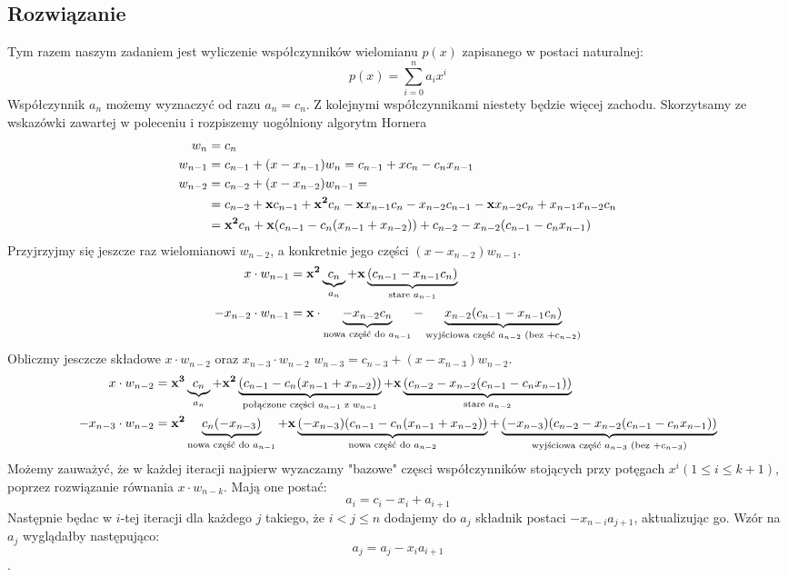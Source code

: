 \documentclass[a4paper]{article}
\begin{document}
    \subsection{Rozwiązanie}
    Tym razem naszym zadaniem jest wyliczenie współczynników wielomianu $p(x)$ zapisanego w postaci naturalnej:
    \[ p(x) = \sum_{i=0}^{n} a_ix^i\]
    Współczynnik $a_n$ możemy wyznaczyć od razu $a_n = c_n$. Z kolejnymi współczynnikami niestety będzie więcej zachodu.
    Skorzytsamy ze wskazówki zawartej w poleceniu i rozpiszemy uogólniony algorytm Hornera
    \begin{align*}
        w_n     &= c_n \\
        w_{n-1} &= c_{n-1} + (x-x_{n-1})w_n = c_{n-1} + xc_{n} - c_nx_{n-1} \\
        w_{n-2} &= c_{n-2} + (x-x_{n-2})w_{n-1} =\\
        &= c_{n-2} + \bold{x}c_{n-1} + \bold{x^2}c_{n} - \bold{x}x_{n-1}c_n - x_{n-2}c_{n-1} - \bold{x}x_{n-2}c_{n} + x_{n-1}x_{n-2}c_n \\
        &= \bold{x^2}c_{n} + \bold{x}(c_{n-1} - c_n(x_{n-1} + x_{n-2})) + c_{n-2} - x_{n-2}(c_{n-1} - c_nx_{n-1})
    \end{align*}
    Przyjrzyjmy się jeszcze raz wielomianowi $w_{n-2}$, a konkretnie jego części $(x-x_{n-2})w_{n-1}$.
    \begin{align*}
        x \cdot w_{n-1} &= \bold{x^2}\underbrace{c_n}_{a_n} + \bold{x}\underbrace{(c_{n-1} - x_{n-1}c_n)}_{\text{stare $a_{n-1}$}} \\
        -x_{n-2} \cdot w_{n-1} &= \bold{x}\cdot\underbrace{-x_{n-2}c_n}_{\text{nowa część do $a_{n-1}$}} - \underbrace{x_{n-2}(c_{n-1} - x_{n-1}c_n)}_{\text{wyjściowa część $a_{n-2}$ (bez $ + c_{n-2}$)}}
    \end{align*}
    Obliczmy jesczcze składowe $x \cdot w_{n-2}$ oraz $x_{n-3} \cdot w_{n-2}$ $w_{n-3} = c_{n-3} + (x - x_{n-3})w_{n-2}$.\\
    \begin{align*}
         x \cdot w_{n-2} &=  \bold{x^3}\underbrace{c_n}_{a_n} + \bold{x^2}\underbrace{(c_{n-1} - c_n(x_{n-1} + x_{n-2}))}_{\text{połączone części } a_{n-1} \text{ z } w_{n-1}} + \bold{x}\underbrace{(c_{n-2} - x_{n-2}(c_{n-1} - c_nx_{n-1}))}_{\text{stare } a_{n-2}} \\
         -x_{n-3} \cdot w_{n-2} &= \bold{x^2}\underbrace{c_n(-x_{n-3})}_{\text{nowa część do } a_{n-1}} + \bold{x}\underbrace{(-x_{n-3})(c_{n-1} - c_n(x_{n-1} + x_{n-2}))}_{\text{nowa część do } a_{n-2}} + \underbrace{(-x_{n-3})(c_{n-2} - x_{n-2}(c_{n-1} - c_nx_{n-1}))}_{\text{wyjściowa część $a_{n-3}$ (bez $ + c_{n-3}$)}} \\
    \end{align*}
    Możemy zauważyć, że w każdej iteracji najpierw wyzaczamy "bazowe" częsci współczynników stojących przy potęgach $x^i (1 \leq i \leq k+1)$, poprzez rozwiązanie równania $x \cdot w_{n-k}$. Mają one postać:
    \[ a_i = c_i - x_i + a_{i+1} \]
    Następnie będac w $i$-tej iteracji dla każdego $j$ takiego, że $i < j \leq n $ dodajemy do $a_j$  składnik postaci $-x_{n-i}a_{j+1}$, aktualizując go. Wzór na $a_j$ wyglądałby następująco:
    \[a_j = a_j - x_ia_{i+1}\].
\end{document}
